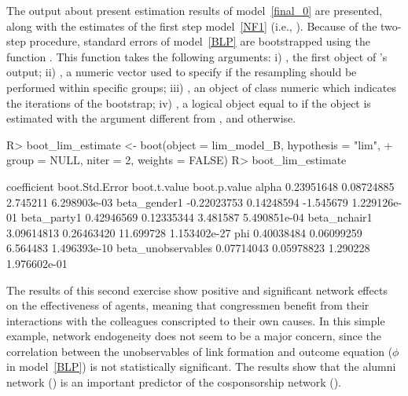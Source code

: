 \documentclass[nojss]{jss}
\begin{document}
The output about present estimation results of model~\ref{final_0} are presented, along with the estimates of the first step model~\ref{NF1} (i.e., ). Because of the two-step procedure, standard errors of model~\ref{BLP} are bootstrapped using the function . This function takes the following arguments: i) , the first object of 's output; ii) , a numeric vector used to specify if the resampling should be performed within specific groups; iii) , an object of class numeric which indicates the iterations of the bootstrap; iv) 
, a logical object equal to  if the object  is estimated with the argument  different from , and  otherwise.
\begin{CodeChunk}
\begin{CodeInput}
R>  boot_lim_estimate <- boot(object = lim_model_B, hypothesis = "lim",
+    group = NULL, niter = 2, weights = FALSE)
R>  boot_lim_estimate
\end{CodeInput}
\begin{CodeOutput}
coefficient boot.Std.Error boot.t.value boot.p.value
alpha               0.23951648     0.08724885     2.745211 6.298903e-03
beta_gender1       -0.22023753     0.14248594    -1.545679 1.229126e-01
beta_party1         0.42946569     0.12335344     3.481587 5.490851e-04
beta_nchair1        3.09614813     0.26463420    11.699728 1.153402e-27
phi                 0.40038484     0.06099259     6.564483 1.496393e-10
beta_unobservables  0.07714043     0.05978823     1.290228 1.976602e-01
\end{CodeOutput}
\end{CodeChunk}
The results of this second exercise show positive and significant network effects on the effectiveness of agents, meaning that congressmen benefit from their interactions with the colleagues conscripted to their own causes. In this simple example, network endogeneity does not seem to be a major concern, since the correlation between the unobservables of link formation and outcome equation ($\phi$ in model~\ref{BLP}) is not statistically significant. The results show that the alumni network () is an important predictor of the cosponsorship network ().
\end{document}
